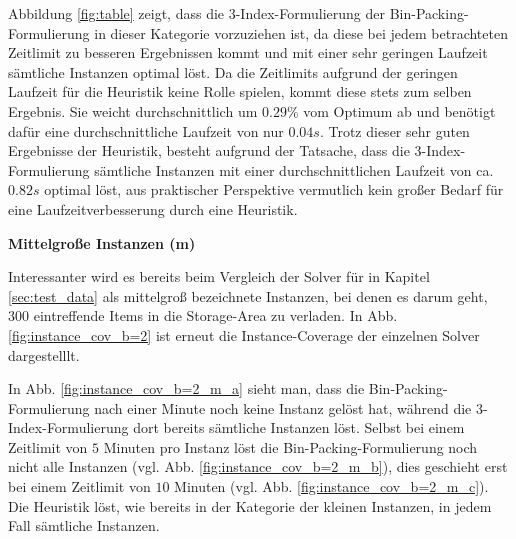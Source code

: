 Abbildung \ref{fig:table} zeigt, dass die 3-Index-Formulierung der Bin-Packing-Formulierung in dieser Kategorie vorzuziehen ist,
da diese bei jedem betrachteten Zeitlimit zu besseren Ergebnissen kommt und mit einer sehr geringen Laufzeit sämtliche Instanzen
optimal löst. Da die Zeitlimits aufgrund der geringen Laufzeit für die Heuristik keine Rolle spielen, kommt diese stets zum selben Ergebnis. Sie weicht durchschnittlich um $0.29 \%$ vom Optimum ab und benötigt dafür eine durchschnittliche Laufzeit von nur $0.04s$.
Trotz dieser sehr guten Ergebnisse der Heuristik, besteht aufgrund der Tatsache, dass die 3-Index-Formulierung sämtliche Instanzen
mit einer durchschnittlichen Laufzeit von ca. $0.82s$ optimal löst, aus praktischer Perspektive vermutlich kein großer Bedarf für
eine Laufzeitverbesserung durch eine Heuristik.

\textbf{Mittelgroße Instanzen (m)}

Interessanter wird es bereits beim Vergleich der Solver für in Kapitel \ref{sec:test_data} als mittelgroß bezeichnete Instanzen,
bei denen es darum geht, $300$ eintreffende Items in die Storage-Area zu verladen.
In Abb. \ref{fig:instance_cov_b=2} ist erneut die Instance-Coverage der einzelnen Solver dargestelllt.

In Abb. \ref{fig:instance_cov_b=2_m_a} sieht man, dass die Bin-Packing-Formulierung nach einer Minute noch keine Instanz gelöst hat, während die 3-Index-Formulierung dort bereits sämtliche Instanzen löst. Selbst bei einem Zeitlimit von $5$ Minuten pro Instanz löst die Bin-Packing-Formulierung noch nicht alle Instanzen (vgl. Abb. \ref{fig:instance_cov_b=2_m_b}),
dies geschieht erst bei einem Zeitlimit von $10$ Minuten (vgl. Abb. \ref{fig:instance_cov_b=2_m_c}).
Die Heuristik löst, wie bereits in der Kategorie der kleinen Instanzen, in jedem Fall sämtliche Instanzen.

